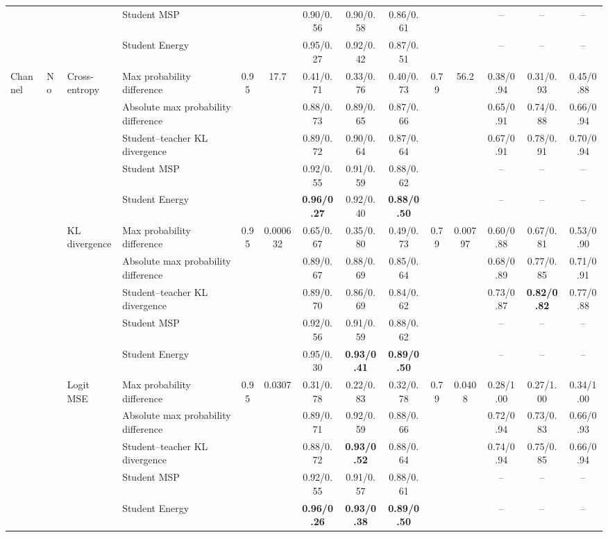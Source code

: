 \documentclass[border=2pt]{standalone}
\begin{document}
\begin{tabular}{llllcccccccccc}
 &  &  & Student MSP &  &  & 0.90/0.56 & 0.90/0.58 & 0.86/0.61 &  &  & -- & -- & -- \\
 &  &  & Student Energy &  &  & 0.95/0.27 & 0.92/0.42 & 0.87/0.51 &  &  & -- & -- & -- \\
\addlinespace
Channel & No & Cross-entropy & Max probability difference & 0.95 & 17.7 & 0.41/0.71 & 0.33/0.76 & 0.40/0.73 & 0.79 & 56.2 & 0.38/0.94 & 0.31/0.93 & 0.45/0.88 \\
 &  &  & Absolute max probability difference &  &  & 0.88/0.73 & 0.89/0.65 & 0.87/0.66 &  &  & 0.65/0.91 & 0.74/0.88 & 0.66/0.94 \\
 &  &  & Student--teacher KL divergence &  &  & 0.89/0.72 & 0.90/0.64 & 0.87/0.64 &  &  & 0.67/0.91 & 0.78/0.91 & 0.70/0.94 \\
 &  &  & Student MSP &  &  & 0.92/0.55 & 0.91/0.59 & 0.88/0.62 &  &  & -- & -- & -- \\
 &  &  & Student Energy &  &  & \textbf{0.96/0.27} & 0.92/0.40 & \textbf{0.88/0.50} &  &  & -- & -- & -- \\
 &  & KL divergence & Max probability difference & 0.95 & 0.000632 & 0.65/0.67 & 0.35/0.80 & 0.49/0.73 & 0.79 & 0.00797 & 0.60/0.88 & 0.67/0.81 & 0.53/0.90 \\
 &  &  & Absolute max probability difference &  &  & 0.89/0.67 & 0.88/0.69 & 0.85/0.64 &  &  & 0.68/0.89 & 0.77/0.85 & 0.71/0.91 \\
 &  &  & Student--teacher KL divergence &  &  & 0.89/0.70 & 0.86/0.69 & 0.84/0.62 &  &  & 0.73/0.87 & \textbf{0.82/0.82} & 0.77/0.88 \\
 &  &  & Student MSP &  &  & 0.92/0.56 & 0.91/0.59 & 0.88/0.62 &  &  & -- & -- & -- \\
 &  &  & Student Energy &  &  & 0.95/0.30 & \textbf{0.93/0.41} & \textbf{0.89/0.50} &  &  & -- & -- & -- \\
 &  & Logit MSE & Max probability difference & 0.95 & 0.0307 & 0.31/0.78 & 0.22/0.83 & 0.32/0.78 & 0.79 & 0.0408 & 0.28/1.00 & 0.27/1.00 & 0.34/1.00 \\
 &  &  & Absolute max probability difference &  &  & 0.89/0.71 & 0.92/0.59 & 0.88/0.66 &  &  & 0.72/0.94 & 0.73/0.83 & 0.66/0.93 \\
 &  &  & Student--teacher KL divergence &  &  & 0.88/0.72 & \textbf{0.93/0.52} & 0.88/0.64 &  &  & 0.74/0.94 & 0.75/0.85 & 0.66/0.94 \\
 &  &  & Student MSP &  &  & 0.92/0.55 & 0.91/0.57 & 0.88/0.61 &  &  & -- & -- & -- \\
 &  &  & Student Energy &  &  & \textbf{0.96/0.26} & \textbf{0.93/0.38} & \textbf{0.89/0.50} &  &  & -- & -- & -- \\

\end{tabular}
\end{document}
